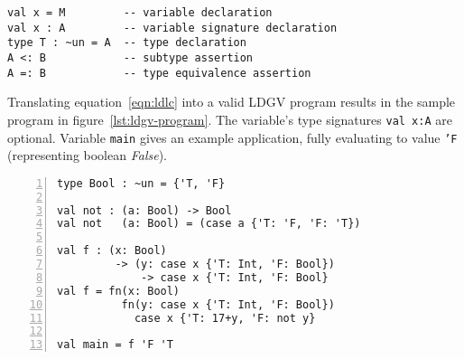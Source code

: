 \begin{lstlisting}[float,language=ldgv,
  caption={LDGV: Statements with expression \texttt{M} and types \texttt{A,B}},
  label=lst:ldgv-statements]
val x = M         -- variable declaration
val x : A         -- variable signature declaration
type T : ~un = A  -- type declaration
A <: B            -- subtype assertion
A =: B            -- type equivalence assertion
\end{lstlisting}

Translating equation~\ref{eqn:ldlc} into a valid LDGV program results in the sample program in figure~\ref{lst:ldgv-program}. The variable's type signatures \texttt{val x:A} are optional.
Variable \texttt{main} gives an example application, fully evaluating to value \texttt{'F} (representing boolean \emph{False}).

\begin{lstlisting}[float,language=ldgv,numbers=left,
  caption=LDGV: Sample program,
  label=lst:ldgv-program]
type Bool : ~un = {'T, 'F}

val not : (a: Bool) -> Bool
val not   (a: Bool) = (case a {'T: 'F, 'F: 'T})

val f : (x: Bool)
         -> (y: case x {'T: Int, 'F: Bool})
             -> case x {'T: Int, 'F: Bool}
val f = fn(x: Bool)
          fn(y: case x {'T: Int, 'F: Bool})
            case x {'T: 17+y, 'F: not y}

val main = f 'F 'T
\end{lstlisting}
